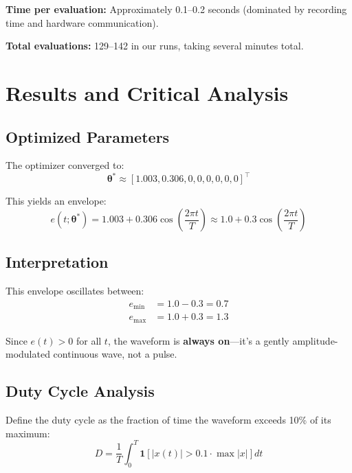 \documentclass[11pt]{article}
\begin{document}
\textbf{Time per evaluation:} Approximately 0.1--0.2 seconds (dominated by recording time and hardware communication).

\textbf{Total evaluations:} 129--142 in our runs, taking several minutes total.

\section{Results and Critical Analysis}

\subsection{Optimized Parameters}

The optimizer converged to:
\begin{equation}
    \boldsymbol{\theta}^* \approx [1.003, 0.306, 0, 0, 0, 0, 0, 0]^\top
\end{equation}

This yields an envelope:
\begin{equation}
    e(t; \boldsymbol{\theta}^*) = 1.003 + 0.306\cos\left(\frac{2\pi t}{T}\right) \approx 1.0 + 0.3\cos\left(\frac{2\pi t}{T}\right)
\end{equation}

\subsection{Interpretation}

This envelope oscillates between:
\begin{align}
    e_{\min} &= 1.0 - 0.3 = 0.7 \\
    e_{\max} &= 1.0 + 0.3 = 1.3
\end{align}

Since $e(t) > 0$ for all $t$, the waveform is \textbf{always on}---it's a gently amplitude-modulated continuous wave, not a pulse.

\subsection{Duty Cycle Analysis}

Define the duty cycle as the fraction of time the waveform exceeds 10\% of its maximum:
\begin{equation}
    D = \frac{1}{T} \int_0^T \mathbf{1}\left[ |x(t)| > 0.1 \cdot \max|x| \right] dt
\end{equation}
\end{document}

